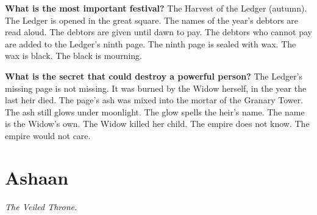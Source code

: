 \begin{almanac}
\textbf{What is the most important festival?} The Harvest of the Ledger (autumn). The Ledger is opened in the great square. The names of the year's debtors are read aloud. The debtors are given until dawn to pay. The debtors who cannot pay are added to the Ledger's ninth page. The ninth page is sealed with wax. The wax is black. The black is mourning.

\textbf{What is the secret that could destroy a powerful person?} The Ledger's missing page is not missing. It was burned by the Widow herself, in the year the last heir died. The page's ash was mixed into the mortar of the Granary Tower. The ash still glows under moonlight. The glow spells the heir's name. The name is the Widow's own. The Widow killed her child. The empire does not know. The empire would not care.
\end{almanac}

\newpage

\newpage

\chapter{Ashaan}
\emph{The Veiled Throne.}

